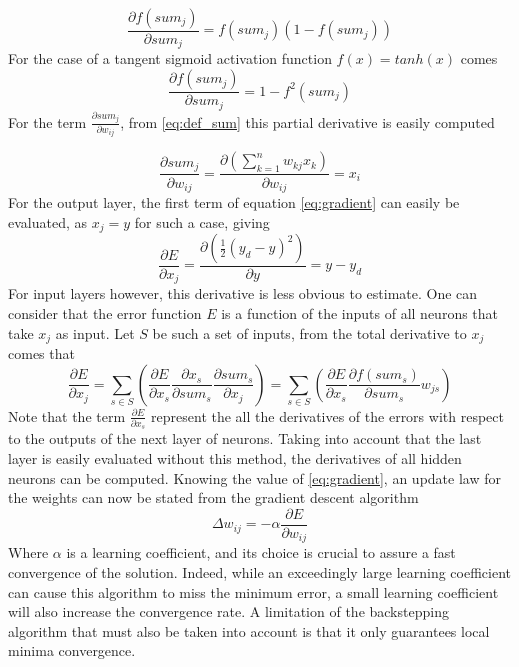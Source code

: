 \begin{equation}
\frac{\partial f(sum_j)}{\partial sum_j}=f(sum_j)(1-f(sum_j))
\end{equation}
For the case of a tangent sigmoid activation function $f(x)=tanh(x)$ comes
\begin{equation}
\frac{\partial f(sum_j)}{\partial sum_j}=1-f^2(sum_j)
\end{equation}
For the term $\frac{\partial sum_j}{\partial w_{ij}}$, from \ref{eq:def_sum} this partial derivative is easily computed

\begin{equation}
\frac{\partial sum_j}{\partial w_{ij}} = \frac{\partial \left(\sum ^n_{k=1} w_{kj} x_k\right)}{\partial w_{ij}} = x_i
\end{equation}
For the output layer, the first term of equation \ref{eq:gradient} can easily be evaluated, as $x_j=y$ for such a case, giving
\begin{equation}
\frac{\partial E}{\partial x_j}=\frac{\partial (\frac{1}{2} (y_d-y)^2)}{\partial y}= y-y_d
\end{equation}
For input layers however, this derivative is less obvious to estimate. One can consider that the error function $E$ is a function of the inputs of all neurons that take $x_j$ as input. Let $S$ be such a set of inputs, from the total derivative to $x_j$ comes that
\begin{equation}
\frac{\partial E}{\partial x_j} = \sum _{s\in S}\left( \frac{\partial E}{\partial x_s}\frac{\partial x_s}{\partial sum_s}\frac{\partial sum_s}{\partial x_j}\right)=\sum _{s\in S}\left( \frac{\partial E}{\partial x_s}\frac{\partial f(sum_s)}{\partial sum_s}w_{js}\right)
\end{equation}
Note that the term $ \frac{\partial E}{\partial x_s} $ represent the all the derivatives of the errors with respect to the outputs of the next layer of neurons. Taking into account that the last layer is easily evaluated without this method, the derivatives of all hidden neurons can be computed. Knowing the value of \ref{eq:gradient}, an update law for the weights can now be stated from the gradient descent algorithm
\begin{equation}\label{eq:update_law}
\Delta w_{ij} = - \alpha \frac{\partial E}{\partial w_{ij}}
\end{equation}
Where $\alpha$ is a learning coefficient, and its choice is crucial to assure a fast convergence of the solution. Indeed, while an exceedingly large learning coefficient can cause this algorithm to miss the minimum error, a small learning coefficient will also increase the convergence rate. A limitation of the backstepping algorithm that must also be taken into account is that it only guarantees local minima convergence.

